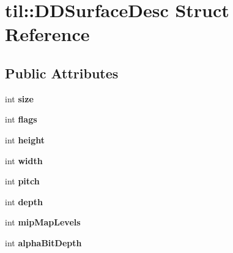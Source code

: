 \hypertarget{structtil_1_1_d_d_surface_desc}{
\section{til::DDSurfaceDesc Struct Reference}
\label{structtil_1_1_d_d_surface_desc}
}
\subsection*{Public Attributes}
\begin{DoxyCompactItemize}
\item 
\hypertarget{structtil_1_1_d_d_surface_desc_af21182db389aa8b5f92f88775f0ef993}{
int {\bfseries size}}
\label{structtil_1_1_d_d_surface_desc_af21182db389aa8b5f92f88775f0ef993}

\item 
\hypertarget{structtil_1_1_d_d_surface_desc_addba710502d9cf3b39ed8f821f049b4c}{
int {\bfseries flags}}
\label{structtil_1_1_d_d_surface_desc_addba710502d9cf3b39ed8f821f049b4c}

\item 
\hypertarget{structtil_1_1_d_d_surface_desc_aa4f5f4ee95083b5389c0bfae857f273b}{
int {\bfseries height}}
\label{structtil_1_1_d_d_surface_desc_aa4f5f4ee95083b5389c0bfae857f273b}

\item 
\hypertarget{structtil_1_1_d_d_surface_desc_a1970dc0c064ecedf19939a95efe58f23}{
int {\bfseries width}}
\label{structtil_1_1_d_d_surface_desc_a1970dc0c064ecedf19939a95efe58f23}

\item 
\hypertarget{structtil_1_1_d_d_surface_desc_aed213fb384e1f713f07f825f37f64cee}{
int {\bfseries pitch}}
\label{structtil_1_1_d_d_surface_desc_aed213fb384e1f713f07f825f37f64cee}

\item 
\hypertarget{structtil_1_1_d_d_surface_desc_a17e5a78f78c6d719095213919c339931}{
int {\bfseries depth}}
\label{structtil_1_1_d_d_surface_desc_a17e5a78f78c6d719095213919c339931}

\item 
\hypertarget{structtil_1_1_d_d_surface_desc_a188eeb7aac59dddc19d0a0e33aff03f0}{
int {\bfseries mipMapLevels}}
\label{structtil_1_1_d_d_surface_desc_a188eeb7aac59dddc19d0a0e33aff03f0}

\item 
\hypertarget{structtil_1_1_d_d_surface_desc_a984a9ed4d94628686db698bbb0f014db}{
int {\bfseries alphaBitDepth}}
\label{structtil_1_1_d_d_surface_desc_a984a9ed4d94628686db698bbb0f014db}


\end{DoxyCompactItemize}
